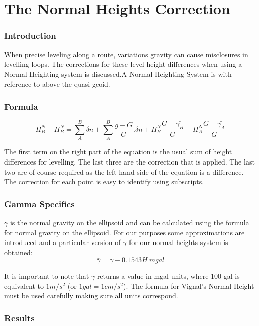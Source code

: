 \documentclass[english]{report}
\begin{document}

\chapter*{The Normal Heights Correction}
\subsection*{Introduction}
When precise leveling along a route, variations gravity can cause misclosures in levelling loops. The corrections for these level height differences when  using a Normal Heighting system is discussed.A Normal Heighting System is with reference to above the quasi-geoid.
\subsection*{Formula}
\begin{equation}
			H^{N}_{B} -  H^{N}_{B} =\sum_{A}^{B}\delta n + \sum_{A}^{B}\dfrac{g-G}{G}.\delta n +H^{N}_{B}\dfrac{G-\bar{\gamma_{B}}}{G} -
			H^{N}_{A}\dfrac{G-\bar{\gamma_{A}}}{G} 
\end{equation}

The first term on the right part of the equation is the usual sum of height differences for levelling. The last three are the correction that is applied. 
The last two are of course required as the left hand side of the equation is a difference. The correction for each point is easy to identify using subscripts.

\subsection*{Gamma Specifics}
$ {\gamma} $ is the normal gravity on the ellipsoid and can be calculated using the formula for normal gravity on the ellipsoid. For our purposes some approximations are introduced and a particular version of $ \gamma $ for our normal heights system is obtained:
\begin{equation}
  \bar{\gamma} = \gamma - 0.1543 H \  mgal
\end{equation}

 
It is important to note that $ \bar{\gamma} $ returns a value in mgal units, where 100 gal is equivalent to $ 1m/s^{2} $ (or $ 1gal=1cm/s^{2} $). The formula for Vignal's Normal Height must be used carefully making sure all units correspond.

\subsection*{Results}


\renewcommand{\bibname}{References}

\end{document}
